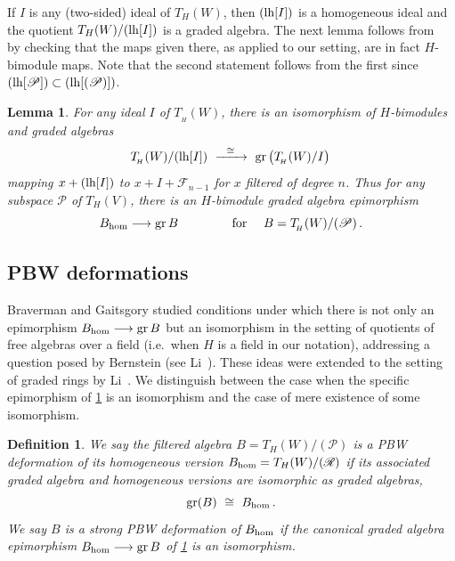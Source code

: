 \documentclass[11pt]{amsart}
\numberwithin{equation}{section}
\newtheorem{lemma}[equation]{Lemma}
\newtheorem{definition}[equation]{Definition}
\DeclareMathOperator{\gr}{gr}
\newcommand{\BBB}{B}
\newcommand{\RR}{\mathscr{R} }
\newcommand{\PP}{\mathscr{P}}
\newcommand{\LH}{{\rm{lh}}}
\newcommand{\hh}{\rm{hom}}
\renewcommand{\_}[1]{\mbox{$_{\left( #1 \right)}$}}
\begin{document}
If $I$ is any (two-sided) ideal of $T_H(W)$,
then $(\LH[I])$ is a homogeneous ideal 
and the quotient $T_H(W)/(\LH[I])$ is a graded algebra.
The next lemma follows from~\cite[Theorem~1.6]{Li} 
by checking that the maps given there, as applied to our setting,
are in fact $H$-bimodule maps.
Note that the second statement follows from the first
since $( \LH[\PP] ) \subset ( \LH[(\PP)] )$.


\begin{lemma}
  \label{Epimorphism}
  For any ideal $I$ of $T_{\! _H}(W)$,
there is an isomorphism of $H$-bimodules and 
  graded algebras
  $$
  T_{\! _H}(W)/(\LH[I]) \ \xrightarrow{\ \ \cong \ \ } \
  \gr\big(T_{\! _H}(W)/I \big) 
  \,
  $$
  mapping
  $x+(\LH[I])$ to $x+I+\mathcal{F}_{n-1}$ 
  for $x$ filtered of degree $n$.
Thus for any subspace $\PP$ of $T_H(V)$, there is
an $H$-bimodule graded algebra epimorphism 
\begin{equation*}
\BBB_{\hh} 
\longrightarrow 
\gr \BBB
\qquad\qquad\text{ for }\quad \BBB=T_{\! _H}(W)/(\PP)
\, . 
\end{equation*}
\end{lemma}

\subsection*{PBW deformations}
Braverman and Gaitsgory \cite{Braverman-Gaitsgory} studied conditions under which
there is not only an epimorphism
$\BBB_{\hh} \longrightarrow  
\gr \BBB $ but an isomorphism
in the setting of quotients of free algebras over a field
(i.e.~when $H$ is a field in our notation), 
addressing a question posed by
Bernstein (see Li~\cite{Li}). 
These ideas were extended to the setting of graded rings
by Li~\cite{Li}.
We distinguish between the case when the specific epimorphism of \cref{Epimorphism}
is an isomorphism
and the case of mere existence of some isomorphism.

\vspace{1ex}

\begin{definition}\label{defn:strongPBW}
{\em 
  We say the filtered algebra
$\BBB=T_{H}(W)/(\PP)$ is a {\em PBW deformation}
of its homogeneous version $\BBB_{\hh}=T_{H}(W)/(\RR)$
if its {associated graded algebra}  and homogeneous versions are isomorphic
as graded algebras,
$$
\gr(\BBB) \ \cong\ \BBB_{\hh} 
\, .
$$
We say 
$\BBB$ is a {\em strong PBW deformation}
of $\BBB_{\hh}$
if the canonical graded algebra epimorphism 
$
\BBB_{\hh} 
\longrightarrow
\gr \BBB 
$
of \cref{Epimorphism} is an isomorphism.
}
\end{definition}
\end{document}
